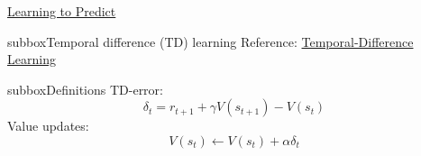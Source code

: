 \begin{textbox}{\href{https://compneuro.neuromatch.io/tutorials/W3D4_ReinforcementLearning/student/W3D4_Tutorial1.html}{Learning to Predict } }
\begin{subbox}{subbox}{Temporal difference (TD) learning}
Reference: \href{https://web.stanford.edu/group/pdplab/pdphandbook/handbookch10.html}{Temporal-Difference Learning}


\end{subbox}
\begin{subbox}{subbox}{Definitions}
\scriptsize
TD-error:
\begin{equation}
\delta_{t} = r_{t+1} + \gamma V(s_{t+1}) - V(s_{t})
\end{equation}
Value updates:
\begin{equation}
V(s_{t}) \leftarrow V(s_{t}) + \alpha \delta_{t}
\end{equation}

\end{subbox}
\end{textbox}
